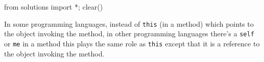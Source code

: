 \begin{python0}
from solutions import *; clear()
\end{python0}

In some programming languages, instead of \texttt{this} (in a method)
which points to the object invoking the method, in other programming
languages there's a \texttt{self} or \texttt{me} in a method
this plays the same role as \texttt{this} except that it is a reference to
the object invoking the method.


